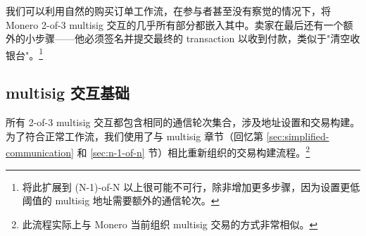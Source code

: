 我们可以利用自然的购买订单工作流，在参与者甚至没有察觉的情况下，将 Monero 2-of-3 multisig 交互的几乎所有部分都嵌入其中。卖家在最后还有一个额外的小步骤——他必须签名并提交最终的 transaction 以收到付款，类似于"清空收银台"。\footnote{将此扩展到 (N-1)-of-N 以上很可能不可行，除非增加更多步骤，因为设置更低阈值的 multisig 地址需要额外的通信轮次。}


\subsection{multisig 交互基础}
\label{subsec:escrowed-marketplace-multisig-interaction-basics}

所有 2-of-3 multisig 交互都包含相同的通信轮次集合，涉及地址设置和交易构建。为了符合正常工作流，我们使用了与 multisig 章节（回忆第 \ref{sec:simplified-communication} 和 \ref{sec:n-1-of-n} 节）相比重新组织的交易构建流程。\footnote{此流程实际上与 Monero 当前组织 multisig 交易的方式非常相似。}

